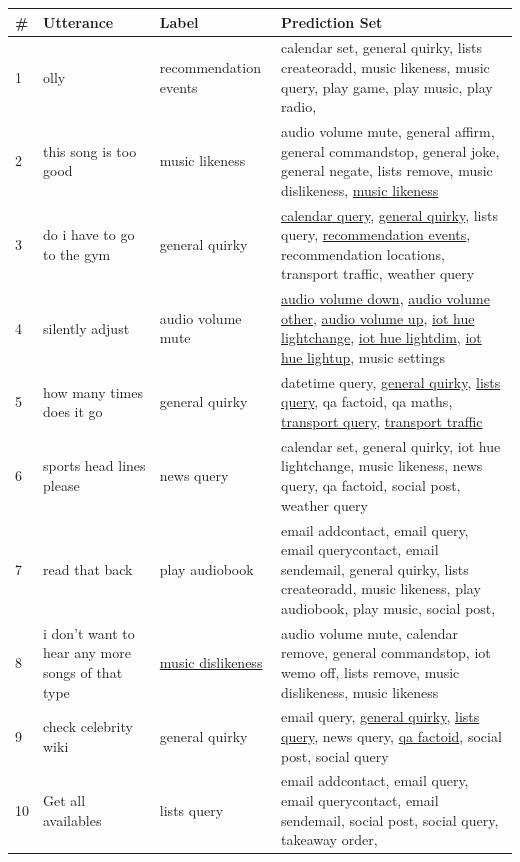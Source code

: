 \documentclass[11pt]{article}
\begin{document}
\begin{table}[h!]
    \centering
    \footnotesize
    \begin{tabular}{l p{} p{} p{}}

    \toprule
    \# & Utterance & Label & Prediction Set \\
    \midrule
1 & olly & recommendation events & calendar set, general quirky, lists createoradd, music likeness, music query, play game, play music, play radio,  \\
2 & this song is too good & music likeness & audio volume mute, general affirm, general commandstop, general joke, general negate, lists remove, music dislikeness, \underline{music likeness} \\
3 & do i have to go to the gym & general quirky & \underline{calendar query}, \underline{general quirky}, lists query, \underline{recommendation events}, recommendation locations, transport traffic, weather query\\
4 & silently adjust & audio volume mute & \underline{audio volume down}, \underline{audio volume other}, \underline{audio volume up}, \underline{iot hue lightchange}, \underline{iot hue lightdim}, \underline{iot hue lightup}, music settings \\
5 & how many times does it go & general quirky & datetime query, \underline{general quirky}, \underline{lists query}, qa factoid, qa maths, \underline{transport query}, \underline{transport traffic} \\
6 & sports head lines please & news query & calendar set, general quirky, iot hue lightchange, music likeness, news query, qa factoid, social post, weather query \\
7 & read that back & play audiobook & email addcontact, email query, email querycontact, email sendemail, general quirky, lists createoradd, music likeness, play audiobook, play music, social post, \\
8 & i don't want to hear any more songs of that type & \underline{music dislikeness} & audio volume mute, calendar remove, general commandstop, iot wemo off, lists remove, music dislikeness, music likeness \\
9 & check celebrity wiki & general quirky & email query, \underline{general quirky}, \underline{lists query}, news query, \underline{qa factoid}, social post, social query \\
10 & Get all availables & lists query & email addcontact, email query, email querycontact, email sendemail, social post, social query, takeaway order,  \\

\end{tabular}
\end{table}
\end{document}
